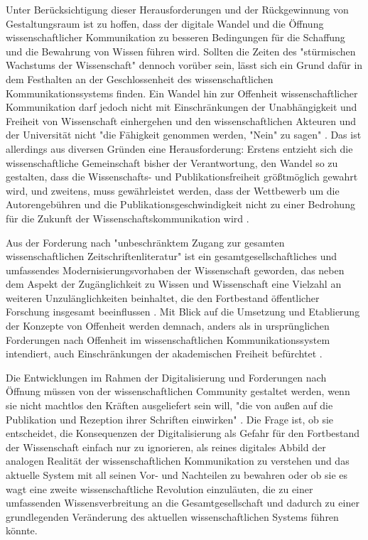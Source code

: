 Unter Berücksichtigung dieser Herausforderungen und der Rückgewinnung von Gestaltungsraum ist zu hoffen, dass der digitale Wandel und die Öffnung wissenschaftlicher Kommunikation zu besseren Bedingungen für die Schaffung und die Bewahrung von Wissen führen wird. Sollten die Zeiten des "stürmischen Wachstums der Wissenschaft" \cite{Koelbel_2002} dennoch vorüber sein, lässt sich ein Grund dafür in dem Festhalten an der Geschlossenheit des wissenschaftlichen Kommunikationssystems finden. Ein Wandel hin zur Offenheit wissenschaftlicher Kommunikation darf jedoch nicht mit Einschränkungen der Unabhängigkeit und Freiheit von Wissenschaft einhergehen und den wissenschaftlichen Akteuren und der Universität nicht "die Fähigkeit genommen werden, "Nein" zu sagen" \cite[:12]{Neidhardt_2006}. Das ist allerdings aus diversen Gründen eine Herausforderung: Erstens entzieht sich die wissenschaftliche Gemeinschaft bisher der Verantwortung, den Wandel so zu gestalten, dass die Wissenschafts- und Publikationsfreiheit größtmöglich gewahrt wird, und zweitens, muss gewährleistet werden, dass der Wettbewerb um die Autorengebühren und die Publikationsgeschwindigkeit nicht zu einer Bedrohung für die Zukunft der Wissenschaftskommunikation wird \cite{Beall_2012} \cite{Lossau_2007}.

Aus der Forderung nach "unbeschränktem Zugang zur gesamten wissenschaftlichen Zeitschriftenliteratur" \cite{BOAI_2012} ist ein gesamtgesellschaftliches und umfassendes Modernisierungsvorhaben der Wissenschaft geworden, das neben dem Aspekt der Zugänglichkeit zu Wissen und Wissenschaft eine Vielzahl an weiteren Unzulänglichkeiten beinhaltet, die den Fortbestand öffentlicher Forschung insgesamt beeinflussen \cite{Brembs_2015}. Mit Blick auf die Umsetzung und Etablierung der Konzepte von Offenheit werden demnach, anders als in ursprünglichen Forderungen nach Offenheit im wissenschaftlichen Kommunikationssystem intendiert, auch Einschränkungen der akademischen Freiheit befürchtet \cite{Hagner_2015}.

Die Entwicklungen im Rahmen der Digitalisierung und Forderungen nach Öffnung müssen von der wissenschaftlichen Community gestaltet werden, wenn sie nicht machtlos den Kräften ausgeliefert sein will, "die von außen auf die Publikation und Rezeption ihrer Schriften einwirken" \cite[:6]{Hirschi_2015}. Die Frage ist, ob sie entscheidet, die Konsequenzen der Digitalisierung als Gefahr für den Fortbestand der Wissenschaft einfach nur zu ignorieren, als reines digitales Abbild der analogen Realität der wissenschaftlichen Kommunikation zu verstehen und das aktuelle System mit all seinen Vor- und Nachteilen zu bewahren oder ob sie es wagt eine zweite wissenschaftliche Revolution einzuläuten, die zu einer umfassenden Wissensverbreitung an die Gesamtgesellschaft und dadurch zu einer grundlegenden Veränderung des aktuellen wissenschaftlichen Systems führen könnte.

